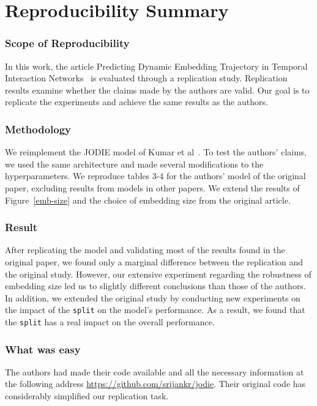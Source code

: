 

\newcommand{\amel}[1]{{\color{orange} #1}} 

\section*{Reproducibility Summary}


\subsubsection{Scope of Reproducibility}
In this work, the article Predicting Dynamic Embedding Trajectory in Temporal Interaction Networks~\cite{kumar2019predicting} is evaluated through a replication study. Replication results examine whether the claims made by the authors are valid. Our goal is to replicate the experiments and achieve the same results as the authors.

\subsubsection{Methodology}
We reimplement the JODIE model of Kumar et al~\cite{kumar2019predicting}. To test the authors' claims, we used the same architecture and made several modifications to the hyperparameters. We reproduce tables 3-4 for the authors' model of the original paper, excluding results from models in other papers. We extend the results of Figure~\ref{emb-size} and the choice of embedding size from the original article.


\subsubsection{Result}
After replicating the model and validating most of the results found in the original paper, we found only a marginal difference between the replication and the original study. However, our extensive experiment regarding the robustness of embedding size led us to slightly different conclusions than those of the authors. In addition, we extended the original study by conducting new experiments on the impact of the \texttt{split} on the model's performance. As a result, we found that the \texttt{split} has a real impact on the overall performance. 

\subsubsection{What was easy}
The authors had made their code available and all the necessary information at the following address \url{https://github.com/srijankr/jodie}. Their original code has considerably simplified our replication task.

